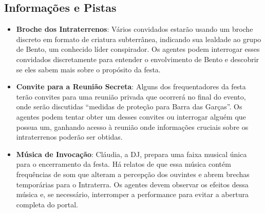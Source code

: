 \subsection{Informações e Pistas}
\begin{itemize}
    \item \textbf{Broche dos Intraterrenos}: Vários convidados estarão usando um broche discreto em formato de criatura subterrânea, indicando sua lealdade ao grupo de Bento, um conhecido líder conspirador. Os agentes podem interrogar esses convidados discretamente para entender o envolvimento de Bento e descobrir se eles sabem mais sobre o propósito da festa.

    \item \textbf{Convite para a Reunião Secreta}: Alguns dos frequentadores da festa terão convites para uma reunião privada que ocorrerá no final do evento, onde serão discutidas ``medidas de proteção para Barra das Garças''. Os agentes podem tentar obter um desses convites ou interrogar alguém que possua um, ganhando acesso à reunião onde informações cruciais sobre os intraterrenos poderão ser obtidas.

    \item \textbf{Música de Invocação}: Cláudia, a DJ, prepara uma faixa musical única para o encerramento da festa. Há relatos de que essa música contém frequências de som que alteram a percepção dos ouvintes e abrem brechas temporárias para o Intraterra. Os agentes devem observar os efeitos dessa música e, se necessário, interromper a performance para evitar a abertura completa do portal.
\end{itemize}

